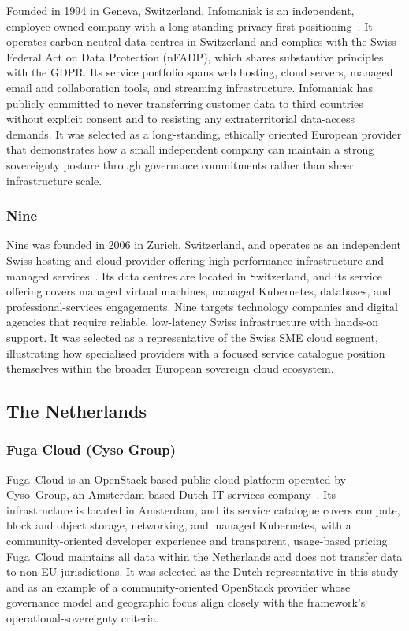 Founded in 1994 in Geneva, Switzerland, Infomaniak is an independent, employee-owned company with a long-standing privacy-first positioning~\cite{Infomaniak_About}. It operates carbon-neutral data centres in Switzerland and complies with the Swiss Federal Act on Data Protection (nFADP), which shares substantive principles with the GDPR. Its service portfolio spans web hosting, cloud servers, managed email and collaboration tools, and streaming infrastructure. Infomaniak has publicly committed to never transferring customer data to third countries without explicit consent and to resisting any extraterritorial data-access demands. It was selected as a long-standing, ethically oriented European provider that demonstrates how a small independent company can maintain a strong sovereignty posture through governance commitments rather than sheer infrastructure scale.

\subsubsection{Nine}

Nine was founded in 2006 in Zurich, Switzerland, and operates as an independent Swiss hosting and cloud provider offering high-performance infrastructure and managed services~\cite{Nine_About}. Its data centres are located in Switzerland, and its service offering covers managed virtual machines, managed Kubernetes, databases, and professional-services engagements. Nine targets technology companies and digital agencies that require reliable, low-latency Swiss infrastructure with hands-on support. It was selected as a representative of the Swiss SME cloud segment, illustrating how specialised providers with a focused service catalogue position themselves within the broader European sovereign cloud ecosystem.

\subsection{The Netherlands}

\subsubsection{Fuga Cloud (Cyso Group)}

Fuga~Cloud is an OpenStack-based public cloud platform operated by Cyso~Group, an Amsterdam-based Dutch IT services company~\cite{FugaCloud_About}. Its infrastructure is located in Amsterdam, and its service catalogue covers compute, block and object storage, networking, and managed Kubernetes, with a community-oriented developer experience and transparent, usage-based pricing. Fuga~Cloud maintains all data within the Netherlands and does not transfer data to non-EU jurisdictions. It was selected as the Dutch representative in this study and as an example of a community-oriented OpenStack provider whose governance model and geographic focus align closely with the framework's operational-sovereignty criteria.

